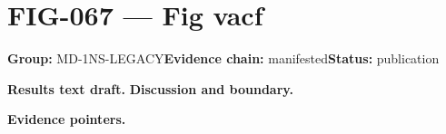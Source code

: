 \clearpage
\section{FIG-067 --- Fig vacf}
\label{figpage:fig-067}
\textbf{Group:} MD-1NS-LEGACY\quad \textbf{Evidence chain:} manifested\quad \textbf{Status:} publication

\textbf{Results text draft.} 
\textbf{Discussion and boundary.} 


\textbf{Evidence pointers.}



\vfill
